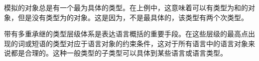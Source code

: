 
模拟的对象总是有一个最为具体的类型。在上例中，这意味着可以有类型为和的对象，但是没有类型为的对象。这是因为，不是最具体的，该类型有两个次类型。

带有多重承继的类型层级体系是表达语言概括的重要手段。在这些层级的最高点出现的词或短语的类型对应于语言对象的约束条件，这对于所有语言中的语言对象来说都是合理的。这种一般类型的子类型可以具体到某些语言或语言类型。

